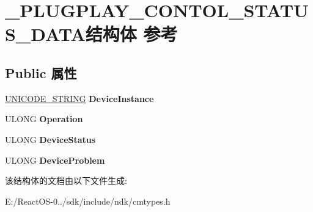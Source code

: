 \hypertarget{struct___p_l_u_g_p_l_a_y___c_o_n_t_o_l___s_t_a_t_u_s___d_a_t_a}{}\section{\+\_\+\+P\+L\+U\+G\+P\+L\+A\+Y\+\_\+\+C\+O\+N\+T\+O\+L\+\_\+\+S\+T\+A\+T\+U\+S\+\_\+\+D\+A\+T\+A结构体 参考}
\label{struct___p_l_u_g_p_l_a_y___c_o_n_t_o_l___s_t_a_t_u_s___d_a_t_a}
\subsection*{Public 属性}
\begin{DoxyCompactItemize}
\item 
\mbox{\label{struct___p_l_u_g_p_l_a_y___c_o_n_t_o_l___s_t_a_t_u_s___d_a_t_a_a6b7b054a6ab7111cef6c00c74ffc551e}} 
\hyperlink{struct___u_n_i_c_o_d_e___s_t_r_i_n_g}{U\+N\+I\+C\+O\+D\+E\+\_\+\+S\+T\+R\+I\+NG} {\bfseries Device\+Instance}
\item 
\mbox{\label{struct___p_l_u_g_p_l_a_y___c_o_n_t_o_l___s_t_a_t_u_s___d_a_t_a_a012987db6b2d3518e8addea2fa0d5c30}} 
U\+L\+O\+NG {\bfseries Operation}
\item 
\mbox{\label{struct___p_l_u_g_p_l_a_y___c_o_n_t_o_l___s_t_a_t_u_s___d_a_t_a_a1daec65ec60d6215e1f0104ce4ceeb3a}} 
U\+L\+O\+NG {\bfseries Device\+Status}
\item 
\mbox{\label{struct___p_l_u_g_p_l_a_y___c_o_n_t_o_l___s_t_a_t_u_s___d_a_t_a_a7b675e73f4aee6fb6ca2c325fc1d94fe}} 
U\+L\+O\+NG {\bfseries Device\+Problem}
\end{DoxyCompactItemize}


该结构体的文档由以下文件生成\+:\begin{DoxyCompactItemize}
\item 
E\+:/\+React\+O\+S-\/0../sdk/include/ndk/cmtypes.\+h\end{DoxyCompactItemize}
